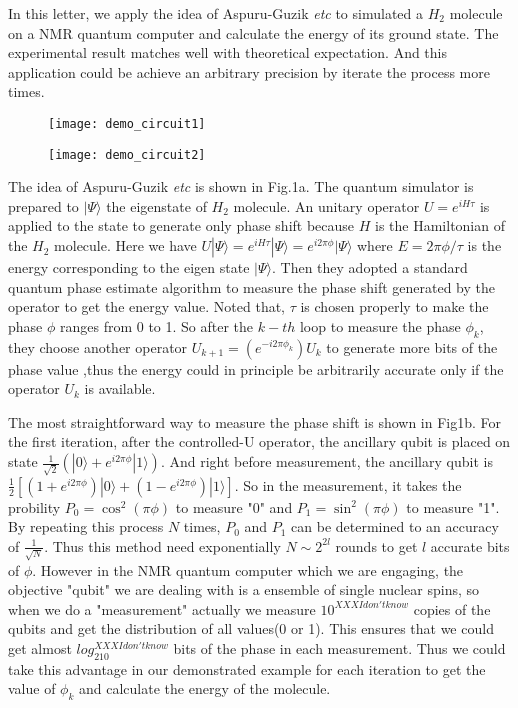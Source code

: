 \documentclass[twocolumn,showpacs,twoside,10pt,superscriptaddress,prl]{revtex4}
\begin{document}
In this letter, we apply the idea of Aspuru-Guzik \emph{etc} to
simulated a $H_2$ molecule on a NMR quantum computer and calculate
the energy of its ground state. The experimental result matches well
with theoretical expectation. And this application could be achieve
an arbitrary precision by iterate the process more times.

\begin{figure}[htb]
\begin{center}
\texttt{[image: demo\_circuit1]}
\end{center}
\begin{center}
\texttt{[image: demo\_circuit2]}
\end{center}
\label{circuit1}
\end{figure}


The idea of Aspuru-Guzik \emph{etc} is shown in Fig.1a. The quantum
simulator is prepared to $|\Psi\rangle$  the eigenstate of $H_2$
molecule. An unitary operator $U=e^{iH\tau}$ is applied to the state
to generate only phase shift because $H$ is the Hamiltonian of the
$H_2$ molecule. Here we have
$U|\Psi\rangle=e^{iH\tau}|\Psi\rangle=e^{i2\pi\phi}|\Psi\rangle$
where $E=2\pi\phi/\tau$ is the energy corresponding to the eigen
state $|\Psi\rangle$. Then they adopted a standard quantum phase
estimate algorithm to measure the phase shift generated by the
operator to get the energy value. Noted that, $\tau$ is chosen
properly to make the phase $\phi$ ranges from 0 to 1. So after the
$k-th$ loop to measure the phase $\phi_k$, they choose another
operator $U_{k+1} =(e^{-i2\pi\phi_k})U_k$ to generate more bits of
the phase value ,thus the energy could in principle be arbitrarily
accurate only if the operator $U_k$ is available.

The most straightforward way to measure the phase shift is shown in
Fig1b. For the first iteration, after the controlled-U operator, the
ancillary qubit is placed on state $\frac{1}{\sqrt{2}}(|0\rangle +
e^{i2\pi\phi}|1\rangle)$. And right before measurement, the
ancillary qubit is $\frac{1}{2}[(1+e^{i2\pi\phi})|0\rangle +
(1-e^{i2\pi\phi})|1\rangle]$. So in the measurement, it takes the
probility $P_0=\cos^2{(\pi\phi)}$ to measure "0" and
$P_1=\sin^2{(\pi\phi)}$ to measure "1". By repeating this process
$N$ times, $P_0$ and $P_1$ can be determined to an accuracy of
$\frac{1}{\sqrt{N}}$. Thus this method need exponentially
$N\sim2^{2l}$ rounds to get $l$ accurate bits of $\phi$. However in
the NMR quantum computer which we are engaging, the objective
"qubit" we are dealing with is a ensemble of single nuclear spins,
so when we do a "measurement" actually we measure
$10^{XXXIdon'tknow}$ copies of the qubits and get the distribution
of all values(0 or 1). This ensures that we could get almost
$log_210^{XXXIdon'tknow}$ bits of the phase in each measurement.
Thus we could take this advantage in our demonstrated example for
each iteration to get the value of $\phi_k$ and calculate the energy
of the molecule.
\end{document}
